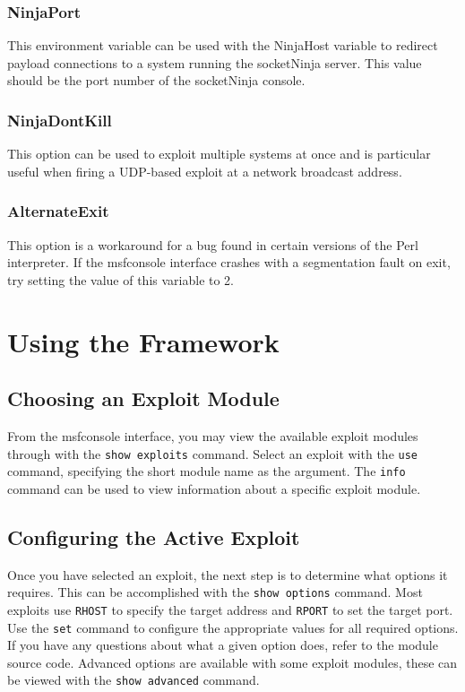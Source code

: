 \documentclass{report}
\begin{document}
	\subsection{NinjaPort}
\par
This environment variable can be used with the NinjaHost variable to redirect
payload connections to a system running the socketNinja server. This value
should be the port number of the socketNinja console. 

	\subsection{NinjaDontKill}
\par
This option can be used to exploit multiple systems at once and is particular
useful when firing a UDP-based exploit at a network broadcast address. 

	\subsection{AlternateExit}
\par
This option is a workaround for a bug found in certain versions of the Perl
interpreter. If the msfconsole interface crashes with a segmentation fault on
exit, try setting the value of this variable to 2. 
	
\pagebreak

\chapter{Using the Framework}


	\section{Choosing an Exploit Module}
\par
From the msfconsole interface, you may view the available exploit modules
through with the \texttt{show exploits} command. Select an exploit with the
\texttt{use} command, specifying the short module name as the argument. The
\texttt{info} command can be used to view information about a specific exploit module. 


	\section{Configuring the Active Exploit}
\par
Once you have selected an exploit, the next step is to determine what options it
requires. This can be accomplished with the \texttt{show options} command. Most exploits
use \texttt{RHOST} to specify the target address and \texttt{RPORT} to set the target port. Use
the \texttt{set} command to configure the appropriate values for all required options. If
you have any questions about what a given option does, refer to the module
source code. Advanced options are available with some exploit modules, these can
be viewed with the \texttt{show advanced} command. 
\end{document}
